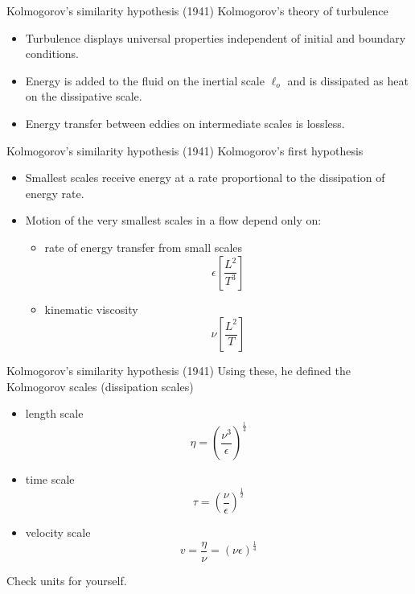 
\begin{frame}{Kolmogorov's similarity hypothesis (1941)}
	Kolmogorov's theory of turbulence
	\begin{itemize}
		\item Turbulence displays universal properties independent of initial and boundary conditions.
		\item Energy is added to the fluid on the inertial scale $\ell_o$ and is dissipated as heat on the dissipative scale.
		\item Energy transfer between eddies on intermediate scales is lossless.
	\end{itemize}
\end{frame}


\begin{frame}{Kolmogorov's similarity hypothesis (1941)}
	Kolmogorov's first hypothesis
	\begin{itemize}
		\item Smallest scales receive energy at a rate proportional to the dissipation of energy rate.
		\item Motion of the very smallest scales in a flow depend only on:
		\begin{itemize}
			\item rate of energy transfer from small scales
			$$\epsilon \left[ \frac{L^2}{T^3}\right]$$
			\item kinematic viscosity
			$$\nu \left[\frac{L^2}{T} \right]$$
		\end{itemize}
	\end{itemize}
\end{frame}


\begin{frame}{Kolmogorov's similarity hypothesis (1941)}
	Using these, he defined the Kolmogorov scales (dissipation scales)
	\begin{itemize}
		\item length scale $$\eta = \left(\frac{\nu^3}{\epsilon}\right)^{\frac{1}{4}}$$
		\item time scale $$\tau = \left(\frac{\nu}{\epsilon}\right)^{\frac{1}{2}}$$
		\item velocity scale $$v = \frac{\eta}{\nu} = (\nu \epsilon)^{\frac{1}{4}}$$
	\end{itemize}
	Check units for yourself.
\end{frame}

